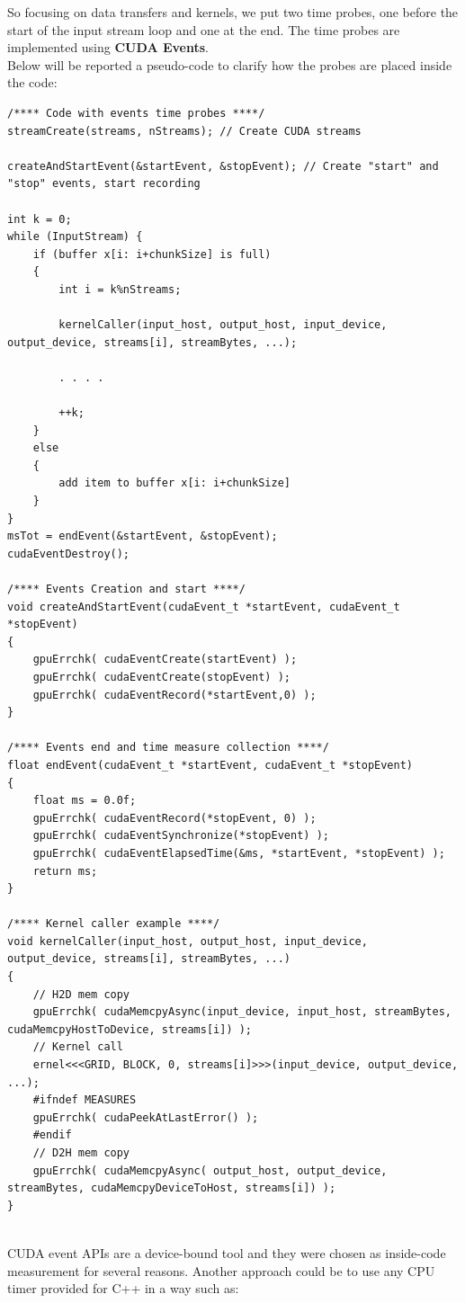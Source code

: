 So focusing on data transfers and kernels, we put two time probes, one before the start of the input stream loop and one at the end. The time probes are implemented using \textbf{CUDA Events}.\\
Below will be reported a pseudo-code to clarify how the probes are placed inside the code:
\begin{lstlisting}[label={lst:timers}]	
/**** Code with events time probes ****/	
streamCreate(streams, nStreams); // Create CUDA streams

createAndStartEvent(&startEvent, &stopEvent); // Create "start" and "stop" events, start recording

int k = 0;
while (InputStream) {  
	if (buffer x[i: i+chunkSize] is full)
	{
		int i = k%nStreams;
		
		kernelCaller(input_host, output_host, input_device, output_device, streams[i], streamBytes, ...);

		. . . .
		
		++k;
	}
	else
	{
		add item to buffer x[i: i+chunkSize]
	}	
} 
msTot = endEvent(&startEvent, &stopEvent);
cudaEventDestroy();
		
/**** Events Creation and start ****/
void createAndStartEvent(cudaEvent_t *startEvent, cudaEvent_t *stopEvent)
{
	gpuErrchk( cudaEventCreate(startEvent) );
	gpuErrchk( cudaEventCreate(stopEvent) );
	gpuErrchk( cudaEventRecord(*startEvent,0) );
}

/**** Events end and time measure collection ****/
float endEvent(cudaEvent_t *startEvent, cudaEvent_t *stopEvent)
{
	float ms = 0.0f;
	gpuErrchk( cudaEventRecord(*stopEvent, 0) );
	gpuErrchk( cudaEventSynchronize(*stopEvent) );
	gpuErrchk( cudaEventElapsedTime(&ms, *startEvent, *stopEvent) );
	return ms;
}
	
/**** Kernel caller example ****/
void kernelCaller(input_host, output_host, input_device, output_device, streams[i], streamBytes, ...)
{
	// H2D mem copy 
	gpuErrchk( cudaMemcpyAsync(input_device, input_host, streamBytes, cudaMemcpyHostToDevice, streams[i]) ); 
	// Kernel call
	ernel<<<GRID, BLOCK, 0, streams[i]>>>(input_device, output_device, ...); 
	#ifndef MEASURES
	gpuErrchk( cudaPeekAtLastError() );
	#endif   
	// D2H mem copy 
	gpuErrchk( cudaMemcpyAsync( output_host, output_device, streamBytes, cudaMemcpyDeviceToHost, streams[i]) );
}
	
\end{lstlisting}
CUDA event APIs are a device-bound tool and they were chosen as inside-code measurement for several reasons.
Another approach could be to use any CPU timer provided for C++ in a way such as:
